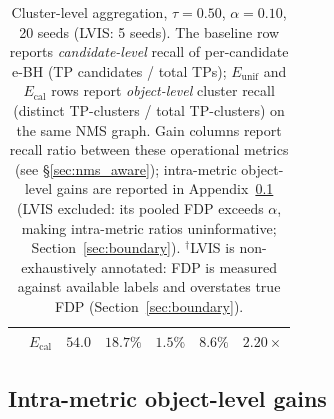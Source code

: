 \documentclass{article}
\theoremstyle{remark}
\newcommand{\1}{\mathbf{1}}
\begin{document}
\begin{table}[h]
\begin{tabular*}{\linewidth}{@{\extracolsep{\fill}}lcccccc@{}}
& $E_{\mathrm{cal}}$   & $54.0$  & $18.7\%$ & $1.5\%$ & $8.6\%$  & $2.20\times$ \\
\bottomrule
\end{tabular*}
\caption{Cluster-level aggregation, $\tau=0.50$, $\alpha=0.10$, 20 seeds
(LVIS: 5 seeds). The baseline row reports \emph{candidate-level} recall
of per-candidate e-BH (TP candidates / total TPs); $E_{\mathrm{unif}}$
and $E_{\mathrm{cal}}$ rows report \emph{object-level} cluster recall
(distinct TP-clusters / total TP-clusters) on the same NMS graph. Gain
columns report recall ratio between these operational metrics (see
\S\ref{sec:nms_aware}); intra-metric object-level gains are reported in
Appendix~\ref{app:intra_metric} (LVIS excluded: its pooled FDP exceeds
$\alpha$, making intra-metric ratios uninformative;
Section~\ref{sec:boundary}).
$^{\dagger}$LVIS is non-exhaustively annotated: FDP is measured against
available labels and overstates true FDP (Section~\ref{sec:boundary}).}
\label{tab:nms_aware_main_app}
\end{table}

\subsection{Intra-metric object-level gains}
\label{app:intra_metric}
\end{document}
